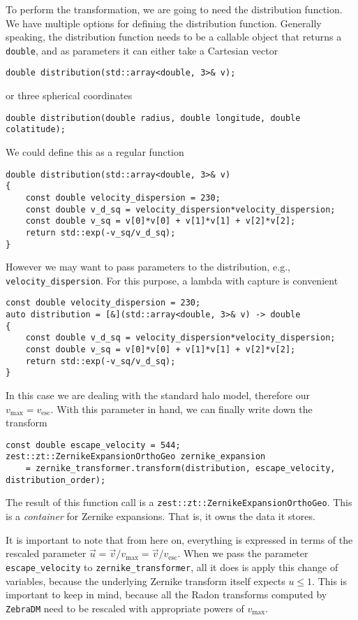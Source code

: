 \documentclass{article}
\begin{document}
To perform the transformation, we are going to need the distribution function. We have multiple options for defining the distribution function. Generally speaking, the distribution function needs to be a callable object that returns a \texttt{double}, and as parameters it can either take a Cartesian vector
\begin{verbatim}
double distribution(std::array<double, 3>& v);
\end{verbatim}
or three spherical coordinates
\begin{verbatim}
double distribution(double radius, double longitude, double colatitude);
\end{verbatim}
We could define this as a regular function
\begin{verbatim}
double distribution(std::array<double, 3>& v)
{
    const double velocity_dispersion = 230;
    const double v_d_sq = velocity_dispersion*velocity_dispersion;
    const double v_sq = v[0]*v[0] + v[1]*v[1] + v[2]*v[2];
    return std::exp(-v_sq/v_d_sq);
}
\end{verbatim}
However we may want to pass parameters to the distribution, e.g., \texttt{velocity_dispersion}. For this purpose, a lambda with capture is convenient
\begin{verbatim}
const double velocity_dispersion = 230;
auto distribution = [&](std::array<double, 3>& v) -> double
{
    const double v_d_sq = velocity_dispersion*velocity_dispersion;
    const double v_sq = v[0]*v[0] + v[1]*v[1] + v[2]*v[2];
    return std::exp(-v_sq/v_d_sq);
}
\end{verbatim}

In this case we are dealing with the standard halo model, therefore our $v_\text{max}=v_\text{esc}$. With this parameter in hand, we can finally write down the transform
\begin{verbatim}
const double escape_velocity = 544;
zest::zt::ZernikeExpansionOrthoGeo zernike_expansion
    = zernike_transformer.transform(distribution, escape_velocity, distribution_order);
\end{verbatim}
The result of this function call is a \texttt{zest::zt::ZernikeExpansionOrthoGeo}. This is a \emph{container} for Zernike expansions. That is, it owns the data it stores.

It is important to note that from here on, everything is expressed in terms of the rescaled parameter $\vec{u}=\vec{v}/v_\text{max}=\vec{v}/v_\text{esc}$. When we pass the parameter \texttt{escape_velocity} to \texttt{zernike_transformer}, all it does is apply this change of variables, because the underlying Zernike transform itself expects $u\leq1$. This is important to keep in mind, because all the Radon transforms computed by \texttt{ZebraDM} need to be rescaled with appropriate powers of $v_\text{max}$.
\end{document}
